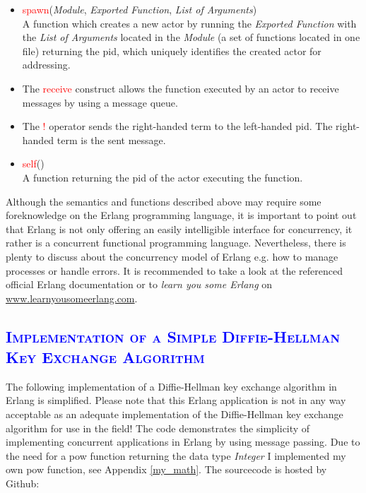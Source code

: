 \documentclass[xcolor=dvipsnames]{article}
\begin{document}
\begin{itemize}

\item \textcolor{red}{spawn}(\textit{Module}, \textit{Exported Function}, \textit{List of Arguments})\\
A function which creates a new actor by running the \textit{Exported Function} with the \textit{List of Arguments} located in the \textit{Module} (a set of functions located in one file) returning the \gls{pid}, which uniquely identifies the created actor for addressing.

\item The \textcolor{red}{receive} construct allows the function executed by an actor to receive messages by using a message queue.

\item The \textcolor{red}{!} operator sends the right-handed term to the \sloppy left-handed \gls{pid}. The right-handed term is the sent message.

\item \textcolor{red}{self}() \\
A function returning the \gls{pid} of the actor executing the function.

\end{itemize}

\noindent Although the semantics and functions described above may require some foreknowledge on the Erlang programming language, it is important to point out that Erlang is not only offering an easily intelligible interface for concurrency, it rather is a concurrent functional programming language. Nevertheless, there is plenty to discuss about the concurrency model of Erlang e.g. how to manage processes or handle errors. It is recommended to take a look at the referenced official Erlang documentation \cite{erl_doc} or to \textit{learn you some Erlang} on \url{www.learnyousomeerlang.com}.

\subsection{\scshape{\textcolor{blue}{Implementation of a Simple Diffie-Hellman Key Exchange Algorithm}}} \label{erlang_implementation}

The following implementation of a Diffie-Hellman key exchange algorithm in Erlang is simplified. Please note that this Erlang application is not in any way acceptable as an adequate implementation of the Diffie-Hellman key exchange algorithm for use in the field! The code demonstrates the simplicity of implementing concurrent applications in Erlang by using message passing. Due to the need for a pow function returning the data type \textit{Integer} I implemented my own pow function, see Appendix \ref{my_math}. The sourcecode is hosted by Github:
\end{document}
